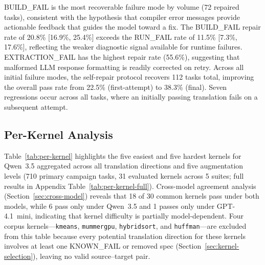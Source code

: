 \documentclass[conference]{IEEEtran}
\begin{document}
BUILD\_FAIL is the most recoverable failure mode by volume (72 repaired tasks), consistent with the hypothesis that compiler error messages provide actionable feedback that guides the model toward a fix. The BUILD\_FAIL repair rate of 20.8\% [16.9\%, 25.4\%] exceeds the RUN\_FAIL rate of 11.5\% [7.3\%, 17.6\%], reflecting the weaker diagnostic signal available for runtime failures. EXTRACTION\_FAIL has the highest repair rate (55.6\%), suggesting that malformed LLM response formatting is readily corrected on retry. Across all initial failure modes, the self-repair protocol recovers 112 tasks total, improving the overall pass rate from 22.5\% (first-attempt) to 38.3\% (final). Seven regressions occur across all tasks, where an initially passing translation fails on a subsequent attempt.

\subsection{Per-Kernel Analysis}
\label{sec:per-kernel}

Table~\ref{tab:per-kernel} highlights the five easiest and five hardest kernels for Qwen~3.5 aggregated across all translation directions and five augmentation levels (710 primary campaign tasks, 31 evaluated kernels across 5 suites; full results in Appendix Table~\ref{tab:per-kernel-full}). Cross-model agreement analysis (Section~\ref{sec:cross-model}) reveals that 18 of 30 common kernels pass under both models, while 6 pass only under Qwen~3.5 and 1 passes only under GPT-4.1~mini, indicating that kernel difficulty is partially model-dependent. %
Four corpus kernels---\texttt{kmeans}, \texttt{mummergpu}, \texttt{hybridsort}, and \texttt{huffman}---are excluded from this table because every potential translation direction for these kernels involves at least one KNOWN\_FAIL or removed spec (Section~\ref{sec:kernel-selection}), leaving no valid source--target pair.
\end{document}
